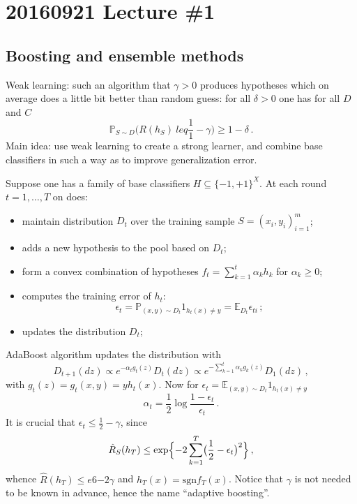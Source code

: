 \documentclass[a4paper]{article}
\newcommand{\ex}{\mathbb{E}}
\newcommand{\pr}{\mathbb{P}}
\begin{document}


%

\section{20160921 Lecture \#1} %
\label{sec:20160921_lecture_1}

\subsection{Boosting and ensemble methods} %
\label{sub:boosting_and_ensemble_methods}

Weak learning: such an algorithm that $\gamma>0$ produces hypotheses which on average
does a little bit better than random guess: for all $\delta>0$ one has for all $D$ and
$C$
\[ \pr_{S\sim D} \bigl(R(h_S) \ leq \frac{1}{1} - \gamma\bigr) \geq 1-\delta \,. \]
Main idea: use weak learning to create a strong learner, and combine base classifiers
in such a way as to improve generalization error.

Suppose one has a family of base classifiers $H\subseteq \{-1,+1\}^X$. At each round
$t=1,\ldots, T$ on does:\begin{itemize}
    \item maintain distribution $D_t$ over the training sample $S=(x_i, y_i)_{i=1}^m$;
    \item adds a new hypothesis to the pool based on $D_t$;
    \item form a convex combination of hypotheses $f_t = \sum_{k=1}^t \alpha_k h_k$
    for $\alpha_k\geq 0$;
    \item computes the training error of $h_t$: 
        \[\epsilon_t = \pr_{(x, y)\sim D_t} 1_{h_t(x)\neq y} = \ex_{D_t} \epsilon_{ti}\,; \]
    \item updates the distribution $D_t$;
\end{itemize}
AdaBoost algorithm updates the distribution with
\[ D_{t+1}(dz)
    \propto e^{-\alpha_t g_t(z) } D_t(dz)
    \propto e^{-\sum_{k=1}^t \alpha_k g_k(z)} D_1(dz)
    \,, \]
with $g_t(z) = g_t(x,y) = y h_t(x)$. Now for $\epsilon_t = \ex_{(x, y)\sim D_t} 1_{h_t(x)\neq y}$
\[ \alpha_t = \frac{1}{2} \log \frac{1-\epsilon_t}{\epsilon_t} \,. \]
It is crucial that $\epsilon_t \leq \frac{1}{2}-\gamma$, since 
\[ \hat{R}_S(h_T) \leq \text{exp}\Bigl\{-2\sum_{k=1}^T \bigr(\frac{1}{2}-\epsilon_t\bigr)^2 \Bigr\} \,, \]
whence $\hat{R}(h_T) \leq e6{-2\gamma}$ and $h_T(x) = \text{sgn} f_T(x)$. Notice
that $\gamma$ is not needed to be known in advance, hence the name ``adaptive boosting''.
\end{document}
